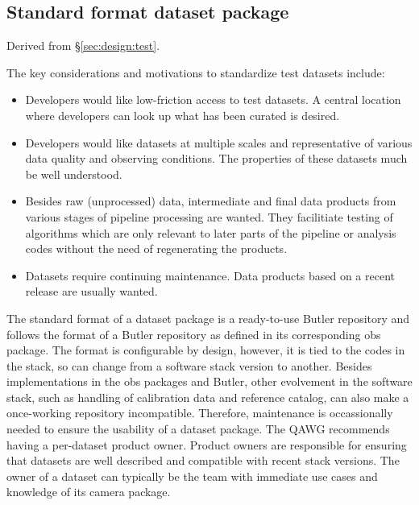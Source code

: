 \subsection{Standard format dataset package}
\label{sec:comp:dataset}

Derived from \S\ref{sec:design:test}.


The key considerations and motivations to standardize test datasets include:

\begin{itemize}

\item{Developers would like low-friction access to test datasets.
A central location where developers can look up what has been curated
is desired.}

\item{Developers would like datasets at multiple scales and
representative of various data quality and observing conditions.
The properties of these datasets much be well understood.}

\item{Besides raw (unprocessed) data, intermediate and final data
products from various stages of pipeline processing are wanted.
They facilitiate testing of algorithms which are only relevant to
later parts of the pipeline or analysis codes without the need of
regenerating the products.}

\item{Datasets require continuing maintenance. Data products based
on a recent release are usually wanted.}

\end{itemize}


The standard format of a dataset package is a ready-to-use Butler
repository and follows the format of a Butler repository as defined
in its corresponding obs package.  The format is configurable by
design, however, it is tied to the codes in the stack, so can change
from a software stack version to another.  Besides implementations
in the obs packages and Butler, other evolvement in the software
stack, such as handling of calibration data and reference catalog,
can also make a once-working repository incompatible.  Therefore,
maintenance is occassionally needed to ensure the usability of a
dataset package.  The QAWG recommends having a per-dataset product
owner.  Product owners are responsible for ensuring that datasets
are well described and compatible with recent stack versions.  The
owner of a dataset can typically be the team with immediate use
cases and knowledge of its camera package.

